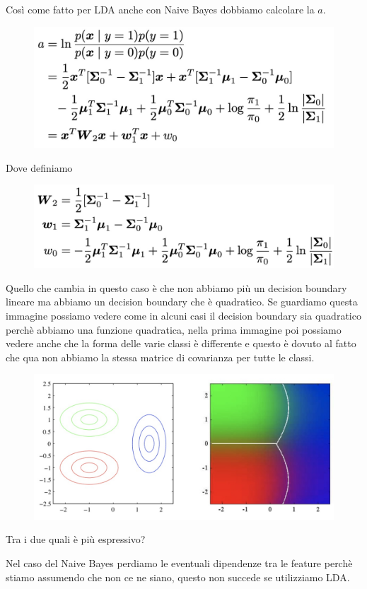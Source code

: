 \documentclass[14pt]{extreport}
\begin{document}
Così come fatto per LDA anche con Naive Bayes dobbiamo calcolare la $a$.

\begin{figure}[H]
\centering
\includegraphics[width=0.7\linewidth]{184.jpeg}
\end{figure}

Dove definiamo

\begin{figure}[H]
\centering
\includegraphics[width=0.7\linewidth]{185.jpeg}
\end{figure}

Quello che cambia in questo caso è che non abbiamo più un decision boundary lineare ma abbiamo un decision boundary che è quadratico. Se guardiamo
questa immagine possiamo vedere come in alcuni casi il decision boundary sia quadratico perchè abbiamo una funzione quadratica, nella prima immagine
poi possiamo vedere anche che la forma delle varie classi è differente e questo è dovuto al fatto che qua non abbiamo la stessa matrice di covarianza
per tutte le classi.

\begin{figure}[H]
\centering
\includegraphics[width=0.5\linewidth]{186.jpeg}
\end{figure}

Tra i due quali è più espressivo?

Nel caso del Naive Bayes perdiamo le eventuali dipendenze tra le feature perchè stiamo assumendo che non ce ne siano, questo non succede se
utilizziamo LDA.
\end{document}
